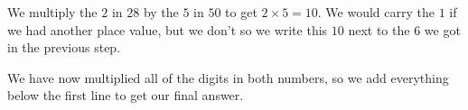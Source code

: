 \documentclass{ximera}
\begin{document}
We multiply the $2$ in $28$ by the $5$ in $50$ to get $2 \times 5 = 10$. We would carry the $1$ if we had another place value, but we don't so we write this $10$ next to the $6$ we got in the previous step.

\begin{center}
\end{center}

We have now multiplied all of the digits in both numbers, so we add everything below the first line to get our final answer.
\end{document}
